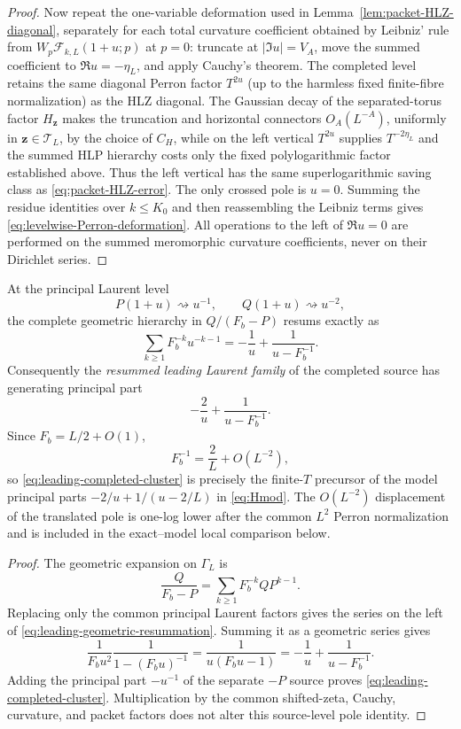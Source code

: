\begin{proof}
Now repeat the one-variable deformation used in
Lemma~\ref{lem:packet-HLZ-diagonal}, separately for each total curvature
coefficient obtained by Leibniz' rule from
$W_p\mathcal F_{k,L}(1+u;p)$ at $p=0$: truncate at $|\Im u|=V_A$, move the
summed coefficient to $\Re u=-\eta_L$, and apply Cauchy's theorem. The
completed level retains the same diagonal Perron factor $T^{2u}$ (up to the
harmless fixed finite-fibre normalization) as the HLZ diagonal. The Gaussian decay of the separated-torus factor
$H_{\mathbf z}$ makes the truncation and horizontal connectors
$O_A(L^{-A})$, uniformly in $\mathbf z\in\mathcal T_L$, by the choice of
$C_H$, while on the left vertical $T^{2u}$ supplies
$T^{-2\eta_L}$ and the summed HLP hierarchy costs only the fixed
polylogarithmic factor established above. Thus the left vertical has the same
superlogarithmic saving class as \eqref{eq:packet-HLZ-error}. The only crossed
pole is $u=0$. Summing the residue identities over $k\le K_0$ and then
reassembling the Leibniz terms gives \eqref{eq:levelwise-Perron-deformation}.
All operations to the left of $\Re u=0$ are performed on the summed
meromorphic curvature coefficients, never on their Dirichlet series.
\end{proof}

\begin{lemma}
\label{lem:leading-jet-resummation}
At the principal Laurent level
\[
P(1+u)\rightsquigarrow u^{-1},
\qquad Q(1+u)\rightsquigarrow u^{-2},
\]
the complete geometric hierarchy in $Q/(F_b-P)$ resums exactly as
\begin{equation}
\boxed{
\sum_{k\ge1}F_b^{-k}u^{-k-1}
=-\frac1u+\frac1{u-F_b^{-1}}.
}
\label{eq:leading-geometric-resummation}
\end{equation}
Consequently the \emph{resummed leading Laurent family} of the completed
source has generating principal part
\begin{equation}
\boxed{-\frac2u+\frac1{u-F_b^{-1}}.}
\label{eq:leading-completed-cluster}
\end{equation}
Since $F_b=L/2+O(1)$,
\[
F_b^{-1}=\frac2L+O(L^{-2}),
\]
so \eqref{eq:leading-completed-cluster} is precisely the finite-$T$ precursor
of the model principal parts
$-2/u+1/(u-2/L)$ in \eqref{eq:Hmod}. The $O(L^{-2})$ displacement of the
translated pole is one-log lower after the common $L^2$ Perron normalization
and is included in the exact--model local comparison below.
\end{lemma}

\begin{proof}
The geometric expansion on $\Gamma_L$ is
\[
\frac{Q}{F_b-P}=\sum_{k\ge1}F_b^{-k}QP^{k-1}.
\]
Replacing only the common principal Laurent factors gives the series on the
left of \eqref{eq:leading-geometric-resummation}. Summing it as a geometric
series gives
\[
\frac1{F_bu^2}\frac1{1-(F_bu)^{-1}}
=\frac1{u(F_bu-1)}
=-\frac1u+\frac1{u-F_b^{-1}}.
\]
Adding the principal part $-u^{-1}$ of the separate $-P$ source proves
\eqref{eq:leading-completed-cluster}. Multiplication by the common shifted-zeta,
Cauchy, curvature, and packet factors does not alter this source-level pole
identity.
\end{proof}

